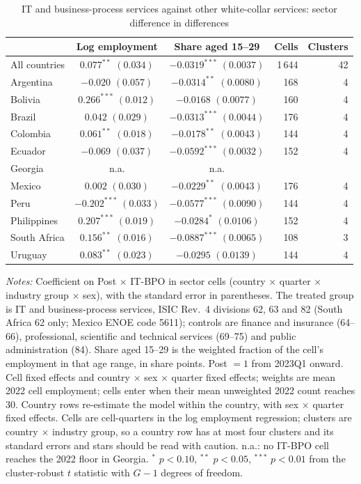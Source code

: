 \begin{table}[htbp]
\centering
\small
\setlength{\tabcolsep}{5pt}
\begin{threeparttable}
\caption{IT and business-process services against other white-collar services: sector difference in differences}
\label{tab:sector}
\begin{tabular}{lccrr}
\toprule
 & Log employment & Share aged 15--29 & Cells & Clusters \\
\midrule
All countries & $0.077^{**}$ $(0.034)$ & $-0.0319^{***}$ $(0.0037)$ & 1\,644 & 42 \\
\midrule
Argentina & $-0.020$ $(0.057)$ & $-0.0314^{**}$ $(0.0080)$ & 168 & 4 \\
Bolivia & $0.266^{***}$ $(0.012)$ & $-0.0168$ $(0.0077)$ & 160 & 4 \\
Brazil & $0.042$ $(0.029)$ & $-0.0313^{***}$ $(0.0044)$ & 176 & 4 \\
Colombia & $0.061^{**}$ $(0.018)$ & $-0.0178^{**}$ $(0.0043)$ & 144 & 4 \\
Ecuador & $-0.069$ $(0.037)$ & $-0.0592^{***}$ $(0.0032)$ & 152 & 4 \\
Georgia & n.a. & n.a. &  &  \\
Mexico & $0.002$ $(0.030)$ & $-0.0229^{**}$ $(0.0043)$ & 176 & 4 \\
Peru & $-0.202^{***}$ $(0.033)$ & $-0.0577^{***}$ $(0.0090)$ & 144 & 4 \\
Philippines & $0.207^{***}$ $(0.019)$ & $-0.0284^{*}$ $(0.0106)$ & 152 & 4 \\
South Africa & $0.156^{**}$ $(0.016)$ & $-0.0887^{***}$ $(0.0065)$ & 108 & 3 \\
Uruguay & $0.083^{**}$ $(0.023)$ & $-0.0295$ $(0.0139)$ & 144 & 4 \\
\bottomrule
\end{tabular}
\begin{tablenotes}[flushleft]
\footnotesize
\item \textit{Notes:} Coefficient on Post $\times$ IT-BPO in sector cells (country $\times$ quarter $\times$ industry group $\times$ sex), with the standard error in parentheses. The treated group is IT and business-process services, ISIC Rev.\ 4 divisions 62, 63 and 82 (South Africa 62 only; Mexico ENOE code 5611); controls are finance and insurance (64--66), professional, scientific and technical services (69--75) and public administration (84). Share aged 15--29 is the weighted fraction of the cell's employment in that age range, in share points. Post $=1$ from 2023Q1 onward. Cell fixed effects and country $\times$ sex $\times$ quarter fixed effects; weights are mean 2022 cell employment; cells enter when their mean unweighted 2022 count reaches 30. Country rows re-estimate the model within the country, with sex $\times$ quarter fixed effects. Cells are cell-quarters in the log employment regression; clusters are country $\times$ industry group, so a country row has at most four clusters and its standard errors and stars should be read with caution. n.a.: no IT-BPO cell reaches the 2022 floor in Georgia. $^{*}$ $p<0.10$, $^{**}$ $p<0.05$, $^{***}$ $p<0.01$ from the cluster-robust $t$ statistic with $G-1$ degrees of freedom.

\end{tablenotes}
\end{threeparttable}
\end{table}
